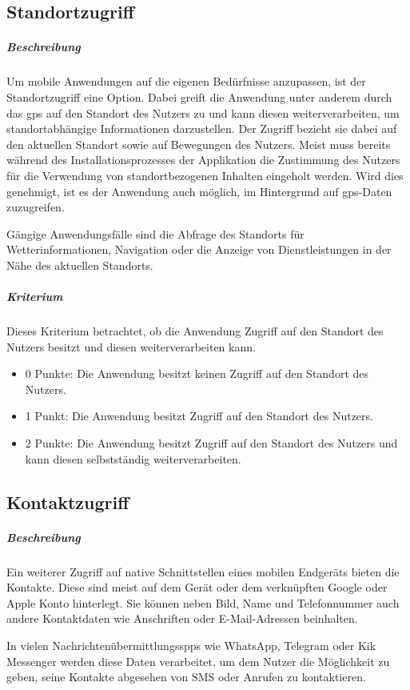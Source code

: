 \subsection{Standortzugriff}
\subparagraph{Beschreibung\\}
Um mobile Anwendungen auf die eigenen Bedürfnisse anzupassen, ist der Standortzugriff eine Option.
Dabei greift die Anwendung unter anderem durch das \ac{gps} auf den Standort des Nutzers zu und kann diesen weiterverarbeiten, um standortabhängige Informationen darzustellen.
Der Zugriff bezieht sie dabei auf den aktuellen Standort sowie auf Bewegungen des Nutzers.
Meist muss bereits während des Installationsprozesses der Applikation die Zustimmung des Nutzers für die Verwendung von standortbezogenen Inhalten eingeholt werden.
Wird dies genehmigt, ist es der Anwendung auch möglich, im Hintergrund auf \ac{gps}-Daten zuzugreifen.

Gängige Anwendungsfälle sind die Abfrage des Standorts für Wetterinformationen, Navigation oder die Anzeige von Dienstleistungen in der Nähe des aktuellen Standorts.

\subparagraph{Kriterium\\}
Dieses Kriterium betrachtet, ob die Anwendung Zugriff auf den Standort des Nutzers besitzt und diesen weiterverarbeiten kann.

\begin{itemize}
\item 0 Punkte: Die Anwendung besitzt keinen Zugriff auf den Standort des Nutzers.
\item 1 Punkt: Die Anwendung besitzt Zugriff auf den Standort des Nutzers.
\item 2 Punkte: Die Anwendung besitzt Zugriff auf den Standort des Nutzers und kann diesen selbstständig weiterverarbeiten.
\end{itemize}

\subsection{Kontaktzugriff}
\subparagraph{Beschreibung\\}
Ein weiterer Zugriff auf native Schnittstellen eines mobilen Endgeräts bieten die Kontakte.
Diese sind meist auf dem Gerät oder dem verknüpften Google oder Apple Konto hinterlegt.
Sie können neben Bild, Name und Telefonnummer auch andere Kontaktdaten wie Anschriften oder E-Mail-Adressen beinhalten.

In vielen Nachrichtenübermittlungsspps wie WhatsApp, Telegram oder Kik Messenger werden diese Daten verarbeitet, um dem Nutzer die Möglichkeit zu geben, seine Kontakte abgesehen von SMS oder Anrufen zu kontaktieren.

